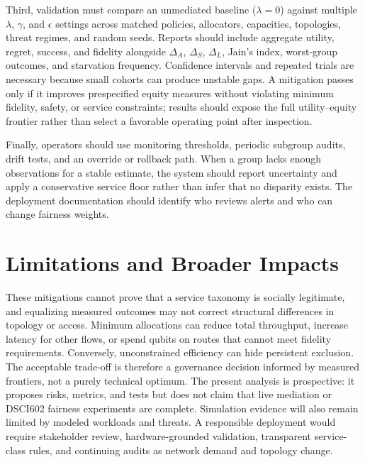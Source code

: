\documentclass[10pt,conference]{IEEEtran}
\begin{document}
Third, validation must compare an unmediated baseline ($\lambda=0$) against multiple $\lambda$, $\gamma$, and $\epsilon$ settings across matched policies, allocators, capacities, topologies, threat regimes, and random seeds. Reports should include aggregate utility, regret, success, and fidelity alongside $\Delta_A$, $\Delta_S$, $\Delta_L$, Jain's index, worst-group outcomes, and starvation frequency. Confidence intervals and repeated trials are necessary because small cohorts can produce unstable gaps. A mitigation passes only if it improves prespecified equity measures without violating minimum fidelity, safety, or service constraints; results should expose the full utility--equity frontier rather than select a favorable operating point after inspection.

Finally, operators should use monitoring thresholds, periodic subgroup audits, drift tests, and an override or rollback path. When a group lacks enough observations for a stable estimate, the system should report uncertainty and apply a conservative service floor rather than infer that no disparity exists. The deployment documentation should identify who reviews alerts and who can change fairness weights.

\section{Limitations and Broader Impacts}

These mitigations cannot prove that a service taxonomy is socially legitimate, and equalizing measured outcomes may not correct structural differences in topology or access. Minimum allocations can reduce total throughput, increase latency for other flows, or spend qubits on routes that cannot meet fidelity requirements. Conversely, unconstrained efficiency can hide persistent exclusion. The acceptable trade-off is therefore a governance decision informed by measured frontiers, not a purely technical optimum. The present analysis is prospective: it proposes risks, metrics, and tests but does not claim that live mediation or DSCI602 fairness experiments are complete. Simulation evidence will also remain limited by modeled workloads and threats. A responsible deployment would require stakeholder review, hardware-grounded validation, transparent service-class rules, and continuing audits as network demand and topology change.



\end{document}
